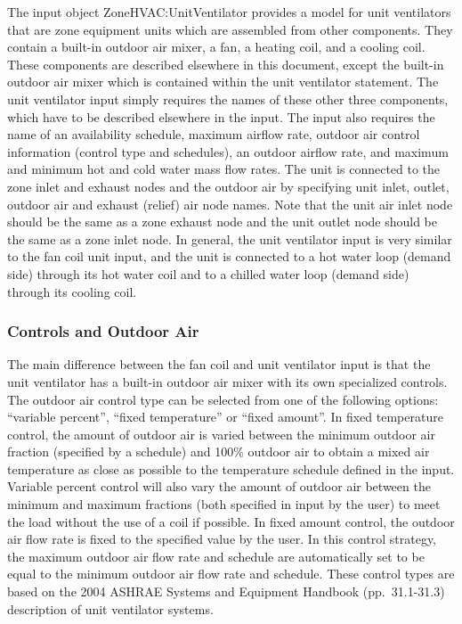 The input object ZoneHVAC:UnitVentilator provides a model for unit ventilators that are zone equipment units which are assembled from other components. They contain a built-in outdoor air mixer, a fan, a heating coil, and a cooling coil. These components are described elsewhere in this document, except the built-in outdoor air mixer which is contained within the unit ventilator statement. The unit ventilator input simply requires the names of these other three components, which have to be described elsewhere in the input. The input also requires the name of an availability schedule, maximum airflow rate, outdoor air control information (control type and schedules), an outdoor airflow rate, and maximum and minimum hot and cold water mass flow rates. The unit is connected to the zone inlet and exhaust nodes and the outdoor air by specifying unit inlet, outlet, outdoor air and exhaust (relief) air node names. Note that the unit air inlet node should be the same as a zone exhaust node and the unit outlet node should be the same as a zone inlet node. In general, the unit ventilator input is very similar to the fan coil unit input, and the unit is connected to a hot water loop (demand side) through its hot water coil and to a chilled water loop (demand side) through its cooling coil.

\subsubsection{Controls and Outdoor Air}\label{controls-and-outdoor-air}

The main difference between the fan coil and unit ventilator input is that the unit ventilator has a built-in outdoor air mixer with its own specialized controls. The outdoor air control type can be selected from one of the following options: ``variable percent'', ``fixed temperature'' or ``fixed amount''. In fixed temperature control, the amount of outdoor air is varied between the minimum outdoor air fraction (specified by a schedule) and 100\% outdoor air to obtain a mixed air temperature as close as possible to the temperature schedule defined in the input. Variable percent control will also vary the amount of outdoor air between the minimum and maximum fractions (both specified in input by the user) to meet the load without the use of a coil if possible. In fixed amount control, the outdoor air flow rate is fixed to the specified value by the user. In this control strategy, the maximum outdoor air flow rate and schedule are automatically set to be equal to the minimum outdoor air flow rate and schedule. These control types are based on the 2004 ASHRAE Systems and Equipment Handbook (pp.~31.1-31.3) description of unit ventilator systems.

